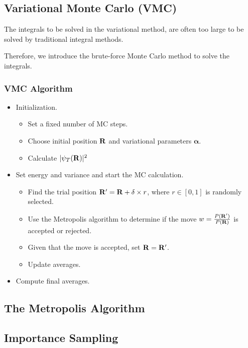 \documentclass[twocolumn]{article}[12pt]
\renewcommand\vec[1]{{\bf #1}}
\begin{document}
\subsection{Variational Monte Carlo (VMC)}
The integrals to be solved in the variational method,
are often too large to be solved by traditional integral methods.

Therefore, we introduce the brute-force Monte Carlo method
to solve the integrals.

\subsubsection{VMC Algorithm}

\begin{itemize}
    \item Initialization.
    \begin{itemize}    
        \item Set a fixed number of MC steps.
        \item Choose initial position $\vec R$ and variational
            parameters $\boldsymbol\alpha$.
        \item Calculate $|\psi_T(\vec R)|^2$
    \end{itemize}
    \item Set energy and variance and start the MC calculation.
    \begin{itemize}    
        \item Find the trial position $\vec R' =\vec R + \delta\times r $,
            where $r\in [0,1]$ is randomly selected.
        \item Use the Metropolis algorithm to determine if the
            move $w =\frac{P(\vec R')}{P(\vec R)}$ is accepted or rejected.
        \item Given that the move is accepted, set $\vec R = \vec R'$.
        \item Update averages.
    \end{itemize}
    \item Compute final averages.
\end{itemize}

\subsection{The Metropolis Algorithm}

\subsection{Importance Sampling}
\end{document}
